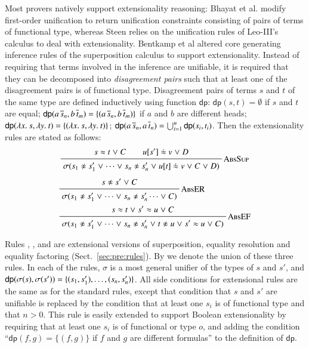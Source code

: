 Most provers natively support extensionality reasoning: Bhayat et al. \cite{br-20-full-sup-w-combs} modify
first-order unification to return unification constraints consisting of pairs of
terms of functional type, whereas Steen relies on the unification rules of
Leo-III's calculus \cite[Section 4.3.3.]{as-18-phd} to deal with extensionality.
Bentkamp et al \cite{bbtvw-21-sup-lam} altered core generating inference rules of the superposition calculus
to support extensionality. Instead of requiring that terms
involved in the inference are unifiable, it is required that they can be
decomposed into \emph{disagreement pairs} such that at least one of the
disagreement pairs is of functional type. Disagreement pairs of terms $s$ and
$t$ of the same type are defined inductively using function $\textsf{dp}$:
$\textsf{dp}(s,t) = \emptyset$ if $s$ and $t$ are equal; $\textsf{dp}(a \,
\overline{s}_{n}, b \, \overline{t}_{m}) = \{(a \,
\overline{s}_{n}, b \, \overline{t}_{m})\}$ if $a$ and $b$ are different heads;
$\textsf{dp}(\lambda x.\> s, \lambda y.\> t) = \{ (\lambda x.\> s, \lambda y.\> t) \}$;
$\textsf{dp}(a \, \overline{s}_{n}, a \, \overline{t}_{n}) = \bigcup_{i=1}^{n}
\textsf{dp}(s_i, t_i)$. Then the extensionality rules are stated as follows:
$$
\namedinference{AbsSup}
  {s \eq t \llor C \qquad u[s'] \mathrel{\dot{\eq}} v \llor D}
  {\sigmacl{s_1 \noteq s'_1 \llor \cdots \llor s_n \noteq s'_n \llor  u[t] \mathrel{\dot{\eq}} v \llor C \llor D}} $$
\pagebreak[2]
\begin{align*}
  &\namedinference{AbsER}{s \noteq s' \llor C}{\sigmacl{s_1 \noteq s'_1 \llor \cdots \llor s_n \noteq s'_n \cdots \llor  C}} \\
  &\namedinference{AbsEF}{s \eq t \llor  s' \eq u \llor C}{\sigmacl{s_1 \noteq s'_1 \llor \cdots \llor s_n \noteq s'_n \llor t \noteq u \llor  s' \eq u \llor C}}
\end{align*}

\noindent{}
Rules , , and  are extensional
versions of superposition, equality resolution and equality factoring
(Sect.~\ref{sec:pre:rules}). By  we denote the union of these three
rules. In each of the rules, $\sigma$ is a most general unifier of the types of
$s$ and $s'$, and $\textsf{dp}(\sigma(s) ,\sigma(s')) = \{ (s_1, s'_1), \ldots,
(s_n, s'_n)\}$. All side conditions for extensional rules are the same as for
the standard rules, except that condition that $s$ and $s'$ are unifiable is
replaced by the condition that at least one $s_i$ is of functional type and that
$n>0$. This rule is easily extended to support Boolean extensionality by
requiring that at least one $s_i$ is of functional or type $o$, and adding the
condition ``$\textsf{dp}(f, g) = \{(f,g)\}$ if $f$ and $g$ are different
formulas'' to the definition of $\textsf{dp}$.

